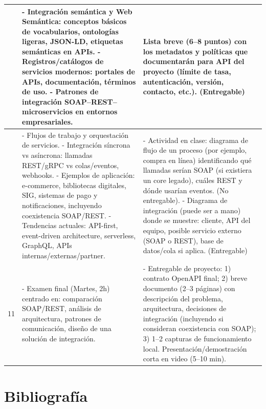 \documentclass[12pt]{article}
\begin{document}
\begin{longtable}{|>{\centering\arraybackslash}p{1.5cm}|p{6.7cm}|p{6.7cm}|}
		9 &
		- Integración semántica y Web Semántica: conceptos básicos de vocabularios, ontologías ligeras, JSON-LD, etiquetas semánticas en APIs.
		\newline- Registros/catálogos de servicios modernos: portales de APIs, documentación, términos de uso.
		\newline- Patrones de integración SOAP–REST–microservicios en entornos empresariales. 
		&
		Lista breve (6–8 puntos) con los metadatos y políticas que documentarán para API del proyecto (límite de tasa, autenticación, versión, contacto, etc.). (Entregable)\\
		\hline
		
		10 &
		- Flujos de trabajo y orquestación de servicios.
		\newline- Integración síncrona vs asíncrona: llamadas REST/gRPC vs colas/eventos, webhooks.
		\newline- Ejemplos de aplicación: e-commerce, bibliotecas digitales, SIG, sistemas de pago y notificaciones, incluyendo coexistencia SOAP/REST.
		\newline- Tendencias actuales: API-first, event-driven architecture, serverless, GraphQL, APIs internas/externas/partner.
		 &
		- Actividad en clase: diagrama de flujo de un proceso (por ejemplo, compra en línea) identificando qué llamadas serían SOAP (si existiera un core legado), cuáles REST y dónde usarían eventos. (No entregable). 
		\newline- Diagrama de integración (puede ser a mano) donde se muestre: cliente, API del equipo, posible servicio externo (SOAP o REST), base de datos/cola si aplica. (Entregable) \\
		\hline
		
		11 &
		- Examen final (Martes, 2h) centrado en: comparación SOAP/REST, análisis de arquitectura, patrones de comunicación, diseño de una solución de integración. &
		- Entregable de proyecto: 1) contrato OpenAPI final; 2) breve documento (2–3 páginas) con descripción del problema, arquitectura, decisiones de integración (incluyendo si consideran coexistencia con SOAP); 3) 1–2 capturas de funcionamiento local. Presentación/demostración corta en video (5–10 min).\\
		\hline
	\end{longtable}
	
	\section*{Bibliografía}
	
\end{document}

